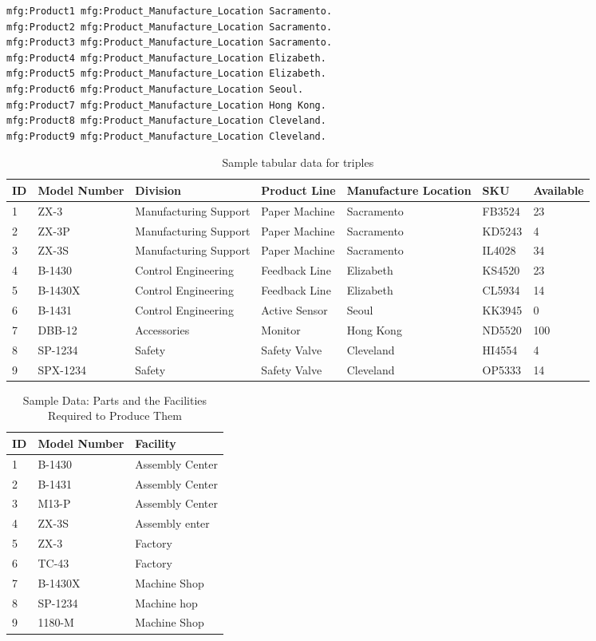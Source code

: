 \begin{lstlisting}
mfg:Product1 mfg:Product_Manufacture_Location Sacramento.
mfg:Product2 mfg:Product_Manufacture_Location Sacramento.
mfg:Product3 mfg:Product_Manufacture_Location Sacramento.
mfg:Product4 mfg:Product_Manufacture_Location Elizabeth.
mfg:Product5 mfg:Product_Manufacture_Location Elizabeth.
mfg:Product6 mfg:Product_Manufacture_Location Seoul.
mfg:Product7 mfg:Product_Manufacture_Location Hong Kong.
mfg:Product8 mfg:Product_Manufacture_Location Cleveland.
mfg:Product9 mfg:Product_Manufacture_Location Cleveland.
\end{lstlisting}


\begin{table}
\label{tab:ch9.1}
\caption{Sample tabular data for triples}
\begin{tabular}{|l l l l l l l|}
\hline
ID&Model Number&Division&Product Line&Manufacture Location&SKU&Available\\
\hline
1&ZX-3&Manufacturing Support&Paper Machine&Sacramento&FB3524&23\\
2&ZX-3P&Manufacturing Support&Paper Machine&Sacramento&KD5243&4\\
3&ZX-3S&Manufacturing Support&Paper Machine&Sacramento&IL4028&34\\
4&B-1430&Control Engineering&Feedback Line&Elizabeth&KS4520&23\\
5&B-1430X&Control Engineering&Feedback Line&Elizabeth&CL5934&14\\
6&B-1431&Control Engineering&Active Sensor&Seoul&KK3945&0\\
7&DBB-12&Accessories&Monitor&Hong Kong&ND5520&100\\
8&SP-1234&Safety&Safety Valve&Cleveland&HI4554&4\\
9&SPX-1234&Safety&Safety Valve&Cleveland&OP5333&14\\
\hline
\end{tabular}
\end{table}

\begin{table}
\label{tab:ch9.2}
\caption{Sample Data: Parts and the Facilities Required to Produce Them}
\begin{tabular}{|l l l|}
\hline
ID&Model Number&Facility\\
\hline
1&B-1430&Assembly Center\\
2&B-1431&Assembly Center\\
3&M13-P&Assembly Center\\
4&ZX-3S&Assembly enter\\
5&ZX-3&Factory\\
6&TC-43&Factory\\
7&B-1430X&Machine Shop\\
8&SP-1234&Machine hop\\
9&1180-M&Machine Shop\\
\hline
\end{tabular}
\end{table}

